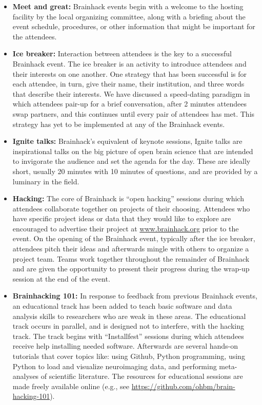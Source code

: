 \documentclass[11pt]{bmc_article_s50}
\begin{document}
\begin{itemize}
\item
  \textbf{Meet and great:} Brainhack events begin with a welcome to the hosting facility by the local organizing committee, along with a briefing about the event schedule, procedures, or other information that might be important for the attendees.
\item
  \textbf{Ice breaker:} Interaction between attendees is the key to a successful Brainhack event. The ice breaker is an activity to introduce attendees and their interests on one another. One strategy that has been successful is for each attendee, in turn, give their name, their institution, and three words that describe their interests. We have discussed a speed-dating paradigm in which attendees pair-up for a brief conversation, after 2 minutes attendees swap partners, and this continues until every pair of attendees has met. This strategy has yet to be implemented at any of the Brainhack events.
\item
  \textbf{Ignite talks:} Brainhack's equivalent of keynote sessions, Ignite talks are inspirational talks on the big picture of open brain science that are intended to invigorate the audience and set the agenda for the day. These are ideally short, usually 20 minutes with 10 minutes of questions, and are provided by a luminary in the field.
\item
  \textbf{Hacking:} The core of Brainhack is ``open hacking'' sessions during which attendees collaborate together on projects of their choosing. Attendees who have specific project ideas or data that they would like to explore are encouraged to advertise their project at \href{http://www.brainhack.org}{www.brainhack.org} prior to the event. On the opening of the Brainhack event, typically after the ice breaker, attendees pitch their ideas and afterwards mingle with others to organize a project team. Teams work together throughout the remainder of Brainhack and are given the opportunity to present their progress during the wrap-up session at the end of the event.
\item
  \textbf{Brainhacking 101:} In response to feedback from previous Brainhack events, an educational track has been added to teach basic software and data analysis skills to researchers who are weak in these areas. The educational track occurs in parallel, and is designed not to interfere, with the hacking track. The track begins with ``Installfest'' sessions during which attendees receive help installing needed software. Afterwards are several hands-on tutorials that cover topics like: using Github, Python programming, using Python to load and visualize neuroimaging data, and performing meta-analyses of scientific literature. The resources for educational sessions are made freely available online (e.g., see \href{https://github.com/ohbm/brain-hacking-101}{https://github.com/ohbm/brain-hacking-101}).

\end{itemize}
\end{document}
